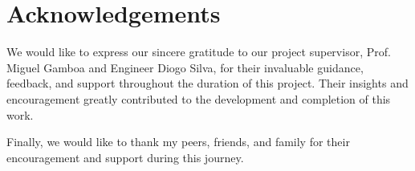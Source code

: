 \section*{Acknowledgements}

We would like to express our sincere gratitude to our project supervisor, Prof. Miguel Gamboa and Engineer Diogo Silva, for their invaluable guidance, feedback, and support throughout the duration of this project. Their insights and encouragement greatly contributed to the development and completion of this work.

Finally, we would like to thank my peers, friends, and family for their encouragement and support during this journey.
